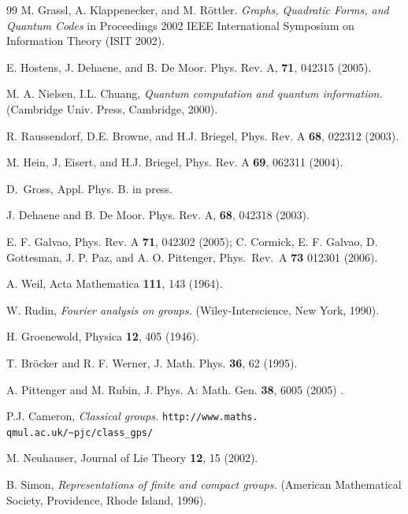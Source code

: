 \documentclass[aps,twocolumn,floatfix]{revtex4}
\begin{document}
\begin{thebibliography}{99}
		M. Grassl, A. Klappenecker, and M. R\"ottler.
		{\it Graphs, Quadratic Forms, and Quantum Codes} 
		in Proceedings 2002 IEEE International Symposium on Information
		Theory (ISIT 2002).

		E. Hostens, J. Dehaene, and B. De Moor. Phys. Rev. A, {\bf 71},
		042315 (2005).

		M. A. Nielsen, I.L. Chuang,
		{\it Quantum computation and quantum information.}
		(Cambridge Univ. Press, Cambridge, 2000).

		R. Raussendorf, D.E. Browne, and H.J. Briegel, Phys. Rev. A {\bf
		68}, 022312 (2003).

		M. Hein, J. Eisert, and H.J. Briegel,
		Phys. Rev. A {\bf 69}, 062311 (2004).

	D.\ Gross, Appl. Phys. B. in press.

		J. Dehaene and B. De Moor. Phys. Rev. A, {\bf 68}, 042318 (2003).

		E. F. Galvao, Phys. Rev. A {\bf 71}, 042302 (2005);
		C. Cormick, E. F. Galvao, D. Gottesman, J. P. Paz, and A. O.
		Pittenger, Phys.\ Rev.\ A {\bf 73} 012301 (2006).

		A. Weil, Acta Mathematica {\bf 111}, 143 (1964).

		W. Rudin, {\it Fourier analysis on groups.} (Wiley-Interscience,
		New York, 1990).

		H. Groenewold, Physica {\bf 12}, 405 (1946).

		T. Br\"ocker and R. F. Werner, J. Math. Phys. {\bf 36}, 62 (1995).

		A. Pittenger and M. Rubin,
		J. Phys. A: Math. Gen. {\bf 38}, 6005 (2005) .

		P.J. Cameron,
		{\it Classical groups.}
		{\tt http://www.maths.}{ }{\tt qmul.ac.uk/\~{}pjc/class\_gps/}

		M. Neuhauser,
		Journal of Lie Theory {\bf 12}, 15 (2002).

		B. Simon, {\it Representations of finite and compact groups.}
		(American Mathematical Society, Providence, Rhode Island, 1996).


\end{thebibliography}
\end{document}
